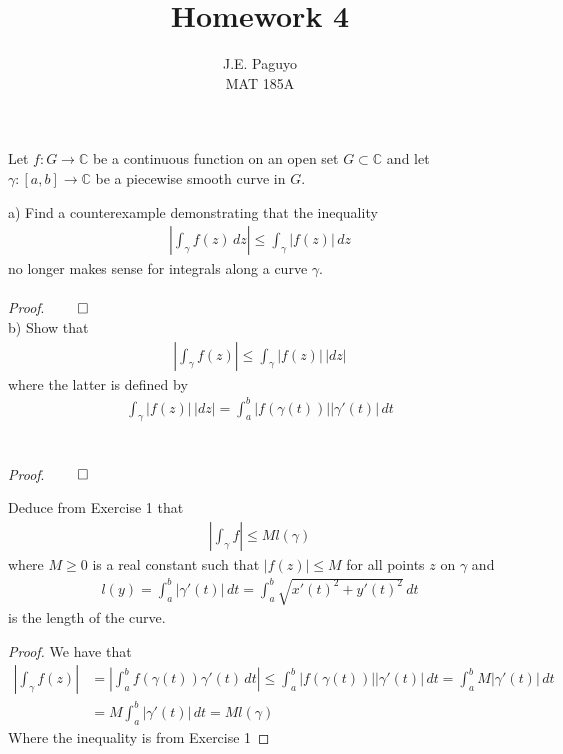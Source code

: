 \documentclass[12pt]{article}
\newcommand{\C}{\mathbb{C}}
\newenvironment{exercise}[2][Exercise]{\begin{trivlist}
\item[\hskip \labelsep {\bfseries #1}\hskip \labelsep {\bfseries #2.}]}{\end{trivlist}}
\begin{document}
 
\title{Homework 4} 
\author{J.E. Paguyo \\ MAT 185A} 
\maketitle
 
\begin{exercise}{1} Let $f: G \to \C$ be a continuous function on an open set $G \subset \C$ and let $\gamma : [a,b] \to \C$ be a piecewise smooth curve in $G$. 
\end{exercise}
 
\noindent a) Find a counterexample demonstrating that the inequality 
\begin{align*}
\left| \int_{\gamma} f(z) \, dz \right| \leq \int_{\gamma} |f(z)| \, dz
\end{align*}
no longer makes sense for integrals along a curve $\gamma$. \\ \\
{\em Proof}. 
$\hfill \qed$ \\

\noindent b) Show that 
\begin{align*}
\left| \int_{\gamma} f(z) \right| \leq \int_{\gamma} |f(z)| \, |dz|
\end{align*}
where the latter is defined by 
\begin{align*}
\int_{\gamma} |f(z)| \, |dz| = \int_a^b |f(\gamma (t))||\gamma'(t)| \, dt 
\end{align*} \\ \\ 
{\em Proof}.
$\hfill \qed$ \\

\begin{exercise}{2} Deduce from Exercise 1 that 
\begin{align*}
\left| \int_{\gamma} f \right| \leq Ml(\gamma)
\end{align*}
where $M \geq 0$ is a real constant such that $|f(z)| \leq M$ for all points $z$ on $\gamma$ and 
\begin{align*}
l(y) = \int_a^b |\gamma'(t)| \, dt = \int_a^b \sqrt{x'(t)^2 + y'(t)^2} \, dt
\end{align*}
is the length of the curve. 
\end{exercise}
 
\begin{proof} We have that 
\begin{align*}
\left| \int_{\gamma} f(z) \right| &= \left| \int_a^b f(\gamma(t)) \gamma'(t) \, dt \right| \leq \int_a^b |f(\gamma(t))||\gamma'(t)| \, dt = \int_a^b M|\gamma'(t)| \, dt \\
&= M\int_a^b |\gamma'(t)| \, dt = Ml(\gamma)
\end{align*}
Where the inequality is from Exercise 1
\end{proof}
\end{document}
